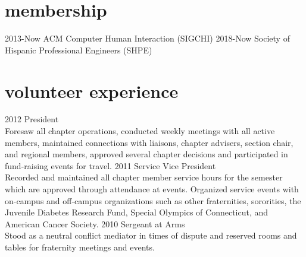 \documentclass[]{cv-style}          %
\begin{document}
\section{membership}
\begin{entrylist}
\entry
{2013-Now}
{ACM Computer Human Interaction (SIGCHI)
}
{}
{\vspace{-0.2cm}}
\entry
{2018-Now}
{Society of Hispanic Professional Engineers (SHPE)
}
{}
{\vspace{-0.2cm}}
\end{entrylist}

\vspace{-0.2cm}
\section{volunteer experience}
\begin{entrylist}
\entry
    {2012}
  {President}
  {}
  {\\
  Foresaw all chapter operations, conducted weekly meetings with all active members, maintained connections with liaisons, chapter advisers, section chair, and regional members, approved several chapter decisions and participated in fund-raising events for travel.}
\entry
    {2011}
  {Service Vice President}
  {}
  {\\
  Recorded and maintained all chapter member service hours for the semester which are approved through attendance at events. Organized service events with on-campus and off-campus organizations such as other fraternities, sororities, the Juvenile Diabetes Research Fund, Special Olympics of Connecticut, and American Cancer Society.}
\entry
    {2010}
  {Sergeant at Arms}
  {}
  {\\
  Stood as a neutral conflict mediator in times of dispute and reserved rooms and tables for fraternity meetings and events.}

\end{entrylist}
\end{document}
